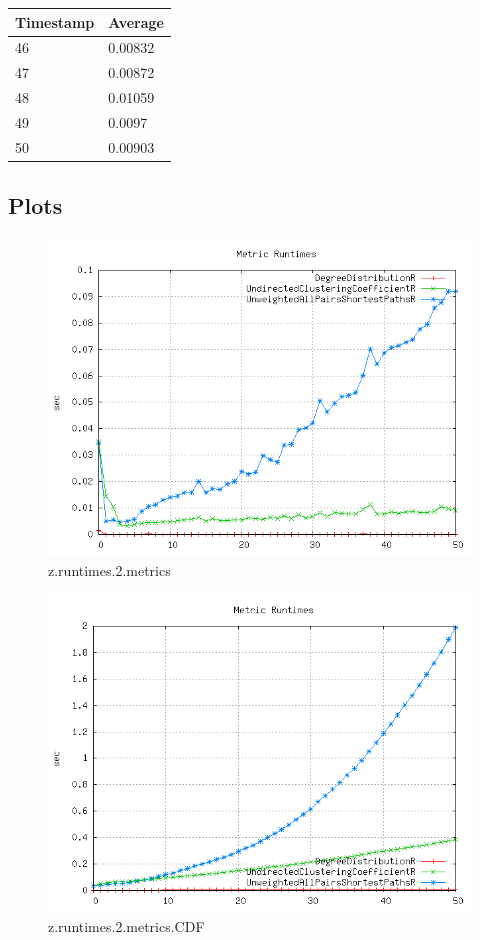 \begin{tabular}{|l||l|}
\hline
	\textbf{Timestamp} & \textbf{Average} \\ \hline
	46 & 0.00832 \\ \hline
	47 & 0.00872 \\ \hline
	48 & 0.01059 \\ \hline
	49 & 0.0097 \\ \hline
	50 & 0.00903 \\ \hline
\end{tabular}

\subsection{Plots}

\begin{figure} [h]
	\centering
	\includegraphics [scale=0.8] {plots/z.runtimes.2.metrics}
	\caption{z.runtimes.2.metrics}
	\label{plot:RANDOM_100_500 - BARABASI_ALBERT_GROWTH_10_2.z.runtimes.2.metrics}
\end{figure}

\begin{figure} [h]
	\centering
	\includegraphics [scale=0.8] {plots/z.runtimes.2.metrics.CDF}
	\caption{z.runtimes.2.metrics.CDF}
	\label{plot:RANDOM_100_500 - BARABASI_ALBERT_GROWTH_10_2.z.runtimes.2.metrics.CDF}
\end{figure}


